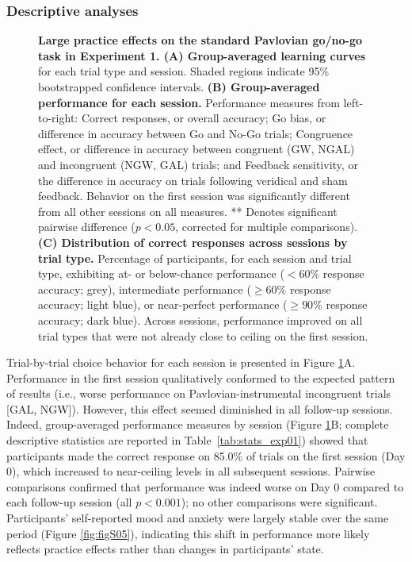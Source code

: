 \documentclass[a4paper,12pt]{article}
\begin{document}
\begin{refsection}[main]
\subsubsection*{Descriptive analyses}

\begin{figure}[hpt]
    \centerline{}
    \caption{{\bf Large practice effects on the standard Pavlovian go/no-go task in Experiment 1. (A) Group-averaged learning curves} for each trial type and session. Shaded regions indicate 95\% bootstrapped confidence intervals. {\bf (B) Group-averaged performance for each session.} Performance measures from left-to-right: Correct responses, or overall accuracy; Go bias, or difference in accuracy between Go and No-Go trials; Congruence effect, or difference in accuracy between congruent (GW, NGAL) and incongruent (NGW, GAL) trials; and Feedback sensitivity, or the difference in accuracy on trials following veridical and sham feedback. Behavior on the first session was significantly different from all other sessions on all measures. ** Denotes significant pairwise difference ($p < 0.05$, corrected for multiple comparisons). {\bf (C) Distribution of correct responses across sessions by trial type.} Percentage of participants, for each session and trial type, exhibiting at- or below-chance performance ($< 60\%$ response accuracy; grey), intermediate performance ($\geq 60\%$ response accuracy; light blue), or near-perfect performance ($\geq 90\%$ response accuracy; dark blue). Across sessions, performance improved on all trial types that were not already close to ceiling on the first session.}
    \label{fig:exp01_behavior}
\end{figure}

Trial-by-trial choice behavior for each session is presented in Figure \ref{fig:exp01_behavior}A. Performance in the first session qualitatively conformed to the expected pattern of results (i.e., worse performance on Pavlovian-instrumental incongruent trials [GAL, NGW]). However, this effect seemed diminished in all follow-up sessions. Indeed, group-averaged performance measures by session (Figure \ref{fig:exp01_behavior}B; complete descriptive statistics are reported in Table~\ref{tab:stats_exp01}) showed that participants made the correct response on 85.0\% of trials on the first session (Day 0), which increased to near-ceiling levels in all subsequent sessions. Pairwise comparisons confirmed that performance was indeed worse on Day 0 compared to each follow-up session (all $p < 0.001$); no other comparisons were significant. Participants' self-reported mood and anxiety were largely stable over the same period (Figure \ref{fig:figS05}), indicating this shift in performance more likely reflects practice effects rather than changes in participants' state. 


\end{refsection}
\end{document}
